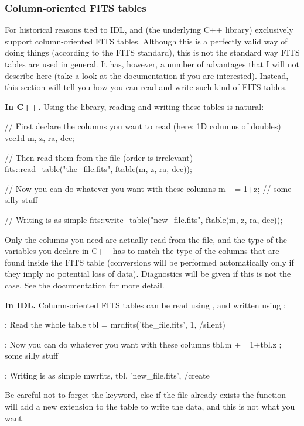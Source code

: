 \subsubsection{Column-oriented FITS tables}

For historical reasons tied to IDL, \egg and \phypp (the underlying C++ library) exclusively support column-oriented FITS tables. Although this is a perfectly valid way of doing things (according to the FITS standard), this is not the standard way FITS tables are used in general. It has, however, a number of advantages that I will not describe here (take a look at the \phypp documentation if you are interested). Instead, this section will tell you how you can read and write such kind of FITS tables.

{\bf In C++.} Using the \phypp library, reading and writing these tables is natural:
\begin{cppcode}
// First declare the columns you want to read (here: 1D columns of doubles)
vec1d m, z, ra, dec;

// Then read them from the file (order is irrelevant)
fits::read_table("the_file.fits", ftable(m, z, ra, dec));

// Now you can do whatever you want with these columns
m += 1+z; // some silly stuff

// Writing is as simple
fits::write_table("new_file.fits", ftable(m, z, ra, dec));
\end{cppcode}
Only the columns you need are actually read from the file, and the type of the variables you declare in C++ has to match the type of the columns that are found inside the FITS table (conversions will be performed automatically only if they imply no potential loss of data). Diagnostics will be given if this is not the case. See the \phypp documentation for more detail.

{\bf In IDL.} Column-oriented FITS tables can be read using , and written using :
\begin{idlcode}
; Read the whole table
tbl = mrdfits('the_file.fits', 1, /silent)

; Now you can do whatever you want with these columns
tbl.m += 1+tbl.z ; some silly stuff

; Writing is as simple
mwrfits, tbl, 'new_file.fits', /create
\end{idlcode}
Be careful not to forget the  keyword, else if the file already exists the function will add a new extension to the table to write the data, and this is not what you want.

